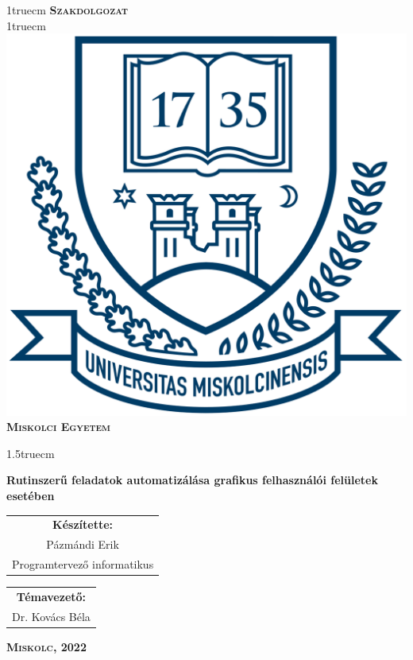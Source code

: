 \pagestyle{empty}

{\large
\begin{center}
\vglue 1truecm
\textbf{\huge\textsc{Szakdolgozat}}\\
\vglue 1truecm
\includegraphics[width=4.8truecm, height=4truecm]{images/me_logo.png}\\
\textbf{\textsc{Miskolci Egyetem}}
\end{center}}

\vglue 1.5truecm

{\LARGE
\begin{center}
\textbf{Rutinszerű feladatok automatizálása grafikus felhasználói felületek esetében}
\end{center}}

\vspace*{2.5truecm}
{\large
\begin{center}
\begin{tabular}{c}
\textbf{Készítette:}\\
Pázmándi Erik\\
Programtervező informatikus
\end{tabular}
\end{center}
\begin{center}
\begin{tabular}{c}
\textbf{Témavezető:}\\
Dr. Kovács Béla
\end{tabular}
\end{center}}
\vfill

{\large
\begin{center}
\textbf{\textsc{Miskolc, 2022}}
\end{center}}

\newpage
